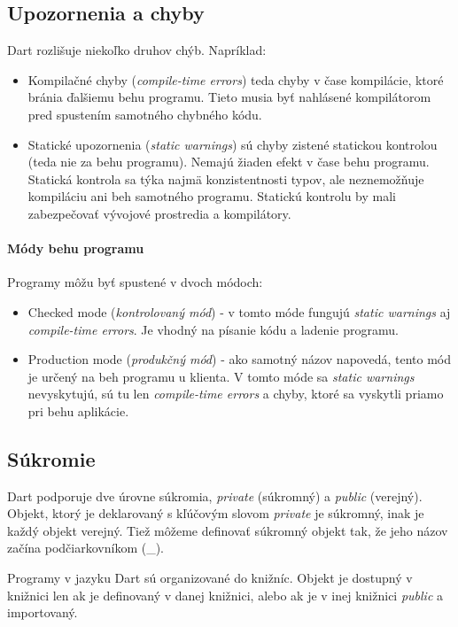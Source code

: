 \subsection{Upozornenia a chyby}%
Dart rozlišuje niekoľko druhov chýb. Napríklad:
\begin{itemize}
\item Kompilačné chyby (\emph{compile-time errors}) teda chyby v čase kompilácie, ktoré bránia ďalšiemu behu programu. Tieto musia byť nahlásené kompilátorom pred spustením samotného chybného kódu.
\item Statické upozornenia (\emph{static warnings}) sú chyby zistené statickou kontrolou (teda nie za behu programu). Nemajú žiaden efekt v čase behu programu.
Statická kontrola sa týka najmä konzistentnosti typov, ale neznemožňuje kompiláciu ani beh samotného programu. Statickú kontrolu by mali zabezpečovať vývojové prostredia a kompilátory.
\end{itemize}

\paragraph{Módy behu programu}
Programy môžu byť spustené v dvoch módoch:
\begin{itemize}
\item Checked mode (\emph{kontrolovaný mód}) - v tomto móde fungujú \emph{static warnings} aj \emph{compile-time errors}. Je vhodný na písanie kódu a ladenie programu.
\item Production mode (\emph{produkčný mód}) - ako samotný názov napovedá, tento mód je určený na beh programu u klienta. V tomto móde sa \emph{static warnings} nevyskytujú, sú tu len \emph{compile-time errors} a chyby, ktoré sa vyskytli priamo pri behu aplikácie.
\end{itemize}

\subsection{Súkromie}
Dart podporuje dve úrovne súkromia, \emph{private} (súkromný) a \emph{public} (verejný).
Objekt, ktorý je deklarovaný s kľúčovým slovom \emph{private} je súkromný, inak je každý objekt verejný. 
Tiež môžeme definovať súkromný objekt tak, že jeho názov začína podčiarkovníkom (\glqq\_\grqq). 

Programy v jazyku Dart sú organizované do knižníc. Objekt je dostupný v knižnici len ak je definovaný v danej knižnici, alebo ak je v inej knižnici \emph{public} a importovaný.

